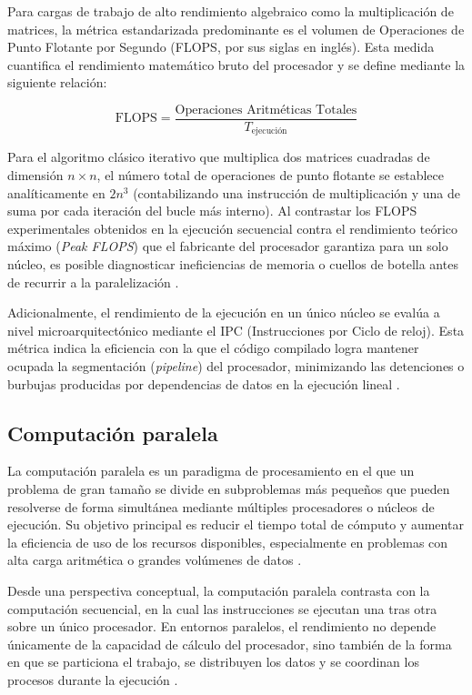 Para cargas de trabajo de alto rendimiento algebraico como la multiplicación de matrices, la métrica estandarizada predominante es el volumen de Operaciones de Punto Flotante por Segundo (FLOPS, por sus siglas en inglés). Esta medida cuantifica el rendimiento matemático bruto del procesador y se define mediante la siguiente relación:

\begin{equation}
    \text{FLOPS} = \frac{\text{Operaciones Aritméticas Totales}}{T_{\text{ejecución}}}
\end{equation}

Para el algoritmo clásico iterativo que multiplica dos matrices cuadradas de dimensión \(n \times n\), el número total de operaciones de punto flotante se establece analíticamente en \(2n^3\) (contabilizando una instrucción de multiplicación y una de suma por cada iteración del bucle más interno). Al contrastar los FLOPS experimentales obtenidos en la ejecución secuencial contra el rendimiento teórico máximo (\textit{Peak FLOPS}) que el fabricante del procesador garantiza para un solo núcleo, es posible diagnosticar ineficiencias de memoria o cuellos de botella antes de recurrir a la paralelización \parencite{Hager2010HPC}. 

Adicionalmente, el rendimiento de la ejecución en un único núcleo se evalúa a nivel microarquitectónico mediante el IPC (Instrucciones por Ciclo de reloj). Esta métrica indica la eficiencia con la que el código compilado logra mantener ocupada la segmentación (\textit{pipeline}) del procesador, minimizando las detenciones o burbujas producidas por dependencias de datos en la ejecución lineal \parencite{Yi2020CPI}.


\subsection{Computación paralela}

La computación paralela es un paradigma de procesamiento en el que un problema de gran tamaño se divide en subproblemas más pequeños que pueden resolverse de forma simultánea mediante múltiples procesadores o núcleos de ejecución. Su objetivo principal es reducir el tiempo total de cómputo y aumentar la eficiencia de uso de los recursos disponibles, especialmente en problemas con alta carga aritmética o grandes volúmenes de datos \parencite{ibmParallelComputing2024}.

Desde una perspectiva conceptual, la computación paralela contrasta con la computación secuencial, en la cual las instrucciones se ejecutan una tras otra sobre un único procesador. En entornos paralelos, el rendimiento no depende únicamente de la capacidad de cálculo del procesador, sino también de la forma en que se particiona el trabajo, se distribuyen los datos y se coordinan los procesos durante la ejecución \parencite{grama2003introduction}.

